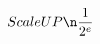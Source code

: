 \documentclass[preview]{standalone}
\begin{document}
\begin{align*}
Scale UP \n \frac{1}{2^{e}}
\end{align*}
\end{document}
